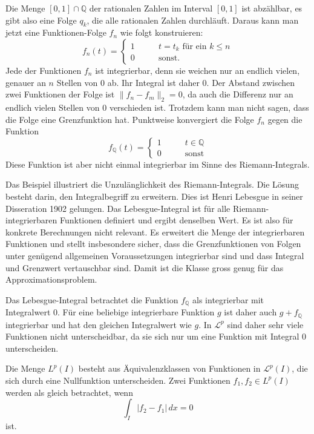 \begin{beispiel}
Die Menge $[0,1]\cap \mathbb Q$ der rationalen Zahlen im Interval
$[0,1]$ ist abzählbar, es gibt  also eine Folge $q_k$, die alle rationalen
Zahlen durchläuft.
Daraus kann man jetzt eine Funktionen-Folge $f_n$ wie folgt konstruieren:
\[
f_n(t) = \begin{cases} 
1&\qquad \text{$t=t_k$ für ein $k\le n$}\\
0&\qquad\text{sonst}.
\end{cases}
\]
Jede der Funktionen $f_n$ ist integrierbar, denn sie weichen nur an
endlich vielen, genauer an $n$ Stellen von $0$ ab.
Ihr Integral ist daher $0$.
Der Abstand zwischen zwei Funktionen der Folge ist $\| f_n-f_m\|_2 = 0$,
da auch die Differenz nur an endlich vielen Stellen von $0$ verschieden ist.
Trotzdem kann man nicht sagen, dass die Folge eine Grenzfunktion hat.
Punktweise konvergiert die Folge $f_n$ gegen die Funktion
\[
f_{\mathbb Q}(t) = \begin{cases}
1&\qquad t\in\mathbb Q\\
0&\qquad\text{sonst}
\end{cases}
\]
Diese Funktion ist aber nicht einmal integrierbar im Sinne des
Riemann-Integrals.
\end{beispiel}

Das Beispiel illustriert die Unzulänglichkeit des Riemann-Integrals.
Die Lösung besteht darin, den Integralbegriff zu erweitern.
Dies ist Henri Lebesgue in seiner Disseration 1902 gelungen.
Das Lebesgue-Integral ist für alle Riemann-integrierbaren Funktionen
definiert und ergibt denselben Wert.
Es ist also für konkrete Berechnungen nicht relevant.
Es erweitert die Menge der integrierbaren Funktionen und stellt insbesondere
sicher, dass die Grenzfunktionen von Folgen unter genügend allgemeinen
Voraussetzungen integrierbar sind und dass Integral und Grenzwert vertauschbar
sind.
Damit ist die Klasse gross genug für das Approximationsproblem.


Das Lebesgue-Integral betrachtet die Funktion $f_{\mathbb Q}$ 
als integrierbar mit Integralwert $0$.
Für eine beliebige integrierbare Funktion $g$ ist daher auch 
$g+f_{\mathbb Q}$ integrierbar und hat den gleichen Integralwert
wie $g$.
In $\mathcal{L}^p$ sind daher sehr viele Funktionen nicht unterscheidbar,
da sie sich nur um eine Funktion mit Integral $0$ unterscheiden.

\begin{definition}
Die Menge $L^p(I)$ besteht aus Äquivalenzklassen von Funktionen in
$\mathcal{L}^p(I)$, die sich durch eine Nullfunktion unterscheiden.
Zwei Funktionen $f_1,f_2\in L^p(I)$ werden als gleich betrachtet,
wenn
\[
\int_I
|f_2-f_1|
\,dx
=0
\]
ist.
\end{definition}

